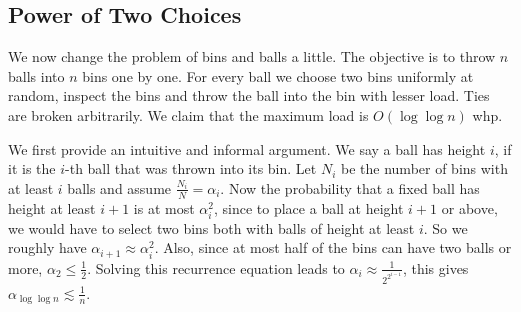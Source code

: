 \subsection{Power of Two Choices}
We now change the problem of bins and balls a little. The objective is to throw $n$ balls into $n$ bins one by one. For every ball we choose two bins uniformly at random, inspect the bins and throw the ball into the bin with lesser load. Ties are broken arbitrarily. We claim that the maximum load is $O(\log \log n)$ whp.

We first provide an intuitive and informal argument. We say a ball has height $i$, if it is the $i$-th ball that was thrown into its bin. Let $N_i$ be the number of bins with at least $i$ balls and assume $\frac{N_i}{N} = \alpha_i$. Now the probability that a fixed ball has height at least $i+1$ is at most $\alpha_i^2$, since to place a ball at height $i+1$ or above, we would have to select two bins both with balls of height at least $i$. So we roughly have $\alpha_{i+1} \approx \alpha_i^2$. Also, since at most half of the bins can have two balls or more, $\alpha_2 \leq \frac{1}{2}$. Solving this recurrence equation leads to 
$\alpha_i \approx \frac{1}{2^{2^{i-1}}}$, this gives $\alpha_{\log \log n} \lesssim
\frac{1}{n}$.

